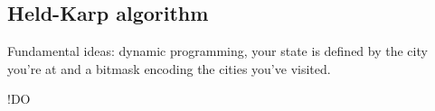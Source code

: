 \subsection{Held-Karp algorithm} \label{algorithm-tsp-heldkarp}
Fundamental ideas: dynamic programming, your state is defined by the city you're at and a bitmask encoding the cities you've visited.\par
!DO
